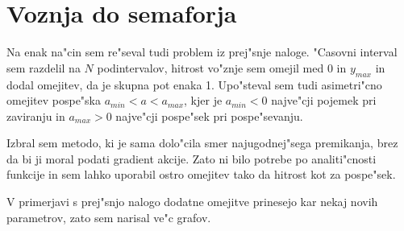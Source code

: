 \documentclass[a4paper,10pt]{article}
\begin{document}
\begin{figure}
  
\end{figure}

\begin{figure}
  
\end{figure}


\section{Voznja do semaforja}
Na enak na"cin sem re"seval tudi problem iz prej"snje naloge. "Casovni interval sem razdelil na $N$ podintervalov, hitrost vo"znje sem omejil med 0 in $y_{max}$ in dodal omejitev, da je skupna pot enaka 1. Upo"steval sem tudi asimetri"cno omejitev pospe"ska $a_{min} < a < a_{max}$, kjer je $a_{min}<0$ najve"cji pojemek pri zaviranju in $a_{max} > 0$ najve"cji pospe"sek pri pospe"sevanju. 

Izbral sem metodo, ki je sama dolo"cila smer najugodnej"sega premikanja, brez da bi ji moral podati gradient akcije. Zato ni bilo potrebe po analiti"cnosti funkcije in sem lahko uporabil ostro omejitev tako da hitrost kot za pospe"sek. 

V primerjavi s prej"snjo nalogo dodatne omejitve prinesejo kar nekaj novih parametrov, zato sem narisal ve"c grafov. 
\end{document}
